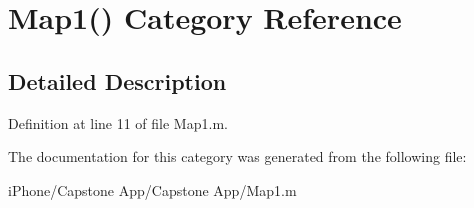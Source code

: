 \hypertarget{category_map1_07_08}{\section{Map1() Category Reference}
\label{category_map1_07_08}
}


\subsection{Detailed Description}


Definition at line 11 of file Map1.\-m.



The documentation for this category was generated from the following file\-:\begin{DoxyCompactItemize}
\item 
i\-Phone/\-Capstone App/\-Capstone App/Map1.\-m\end{DoxyCompactItemize}
